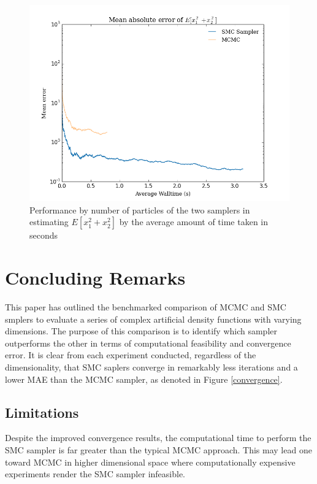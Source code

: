 \documentclass[12pt]{elsarticle}
\begin{document}
\begin{figure}[htbp]
\begin{center}
\includegraphics[width = \textwidth]{plots/2d-errors_walltime.png}
\caption{Performance by number of particles of the two samplers in estimating $E[x_1^2 + x_2^2]$ by the average amount of time taken in seconds}
\label{multi_walltime}
\end{center}
\end{figure}




\section*{Concluding Remarks}
This paper has outlined the benchmarked comparison of MCMC and SMC smplers to evaluate a series of complex artificial density functions with varying dimensions. The purpose of this comparison is to identify which sampler outperforms the other in terms of computational feasibility and convergence error. It is clear from each experiment conducted, regardless of the dimensionality, that SMC saplers converge in remarkably less iterations and a lower MAE than the MCMC sampler, as denoted in Figure \ref{convergence}. \\

\subsection*{Limitations}
Despite the improved convergence results, the computational time to perform the SMC sampler is far greater than the typical MCMC approach. This may lead one toward MCMC in higher dimensional space where computationally expensive experiments render the SMC sampler infeasible.
\end{document}
